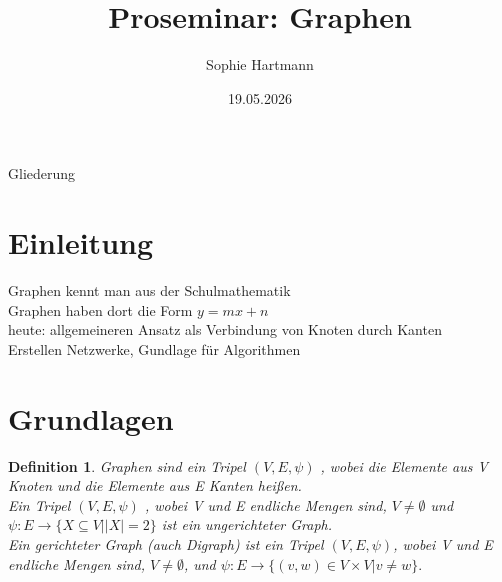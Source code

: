 \documentclass{beamer}
\title{Proseminar: Graphen}
\author{Sophie Hartmann}
\date{19.05.2026}
\newtheorem{defi}[satz]{Definition}
\begin{document}
\begin{frame}[plain]
    \titlepage
\end{frame}


\begin{frame}{Gliederung}
    \tableofcontents[hideallsubsections]
\end{frame}

\section{Einleitung}
\begin{frame}
  \vfill
    \begin{center}
      Graphen kennt man aus der Schulmathematik\\
      Graphen haben dort die Form $y=mx+n$\\
      heute: allgemeineren Ansatz als Verbindung von Knoten durch Kanten\\
      Erstellen Netzwerke, Gundlage für Algorithmen 
    \end{center}
  \vfill
  \end{frame}

\section{Grundlagen}
  \begin{frame}
  \vfill
    \begin{center}
      \begin{defi} 
        Graphen sind ein Tripel $(V,E,\psi)$ , wobei die Elemente aus V Knoten und die Elemente aus E Kanten heißen.\\
       Ein Tripel $(V,E,\psi)$ , wobei V und E endliche Mengen sind,
        $V \neq \emptyset$  und $\psi : E\rightarrow \{X \subseteq  V| |X|=2\}$
        ist ein ungerichteter Graph.\\
        Ein gerichteter Graph (auch Digraph) ist ein Tripel $(V, E, \psi)$, wobei V und E endliche Mengen sind, 
        $V\neq \emptyset$, und $\psi: E\rightarrow \{(v,w)\in V\times V| v\neq w\}.$\\
      \end{defi}
    \end{center}
  \vfill
  \end{frame}
\end{document}
